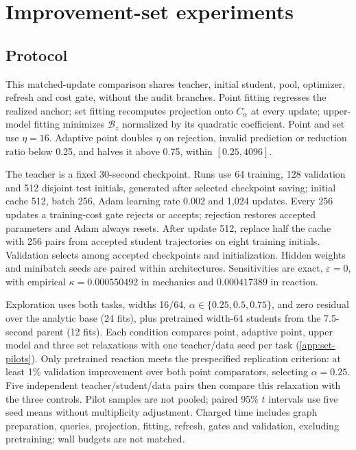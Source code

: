 \section{Improvement-set experiments}\label{sec:set-experiments}
\subsection{Protocol}
This matched-update comparison shares teacher, initial student, pool,
optimizer, refresh and cost gate, without the audit branches. Point
fitting regresses the realized anchor; set fitting recomputes projection
onto $C_\alpha$ at every update; upper-model fitting minimizes
$\mathcal B_z$ normalized by its quadratic coefficient. Point and set
use $\eta=16$. Adaptive point doubles $\eta$ on rejection, invalid
prediction or reduction ratio below 0.25, and halves it above 0.75,
within $[0.25,4096]$.

The teacher is a fixed 30-second checkpoint. Runs use 64 training,
128 validation and 512 disjoint test initials, generated after selected
checkpoint saving; initial cache 512, batch 256, Adam learning rate
0.002 and 1,024 updates. Every 256 updates a training-cost gate rejects
or accepts; rejection restores accepted parameters and Adam always resets.
After update 512, replace half the cache with 256 pairs from accepted
student trajectories on eight training initials. Validation selects
among accepted checkpoints and initialization. Hidden weights and
minibatch seeds are paired within architectures. Sensitivities are exact,
$\varepsilon=0$, with empirical $\kappa=0.000550492$ in mechanics
and $0.000417389$ in reaction.

Exploration uses both tasks, widths 16/64, $\alpha\in\{0.25,0.5,0.75\}$,
and zero residual over the analytic base (24 fits), plus pretrained
width-64 students from the 7.5-second parent (12 fits). Each condition
compares point, adaptive point, upper model and three set relaxations
with one teacher/data seed per task (\ref{app:set-pilots}).
Only pretrained reaction meets the prespecified replication criterion:
at least 1\% validation improvement over both point comparators,
selecting $\alpha=0.25$. Five independent teacher/student/data pairs
then compare this relaxation with the three controls. Pilot samples
are not pooled; paired 95\% $t$ intervals use five seed means without
multiplicity adjustment. Charged time includes graph preparation,
queries, projection, fitting, refresh, gates and validation, excluding
pretraining; wall budgets are not matched.

